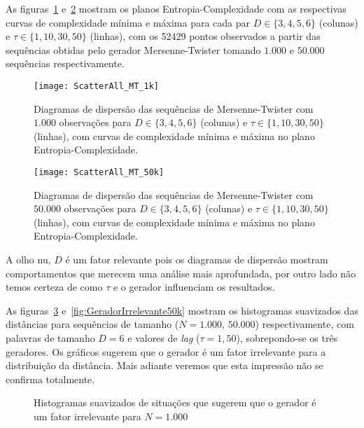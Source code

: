 As figuras~\ref{Fig:ScatterAll_MT_1k} e~\ref{Fig:ScatterAll_MT_50k} mostram os planos Entropia-Complexidade com as respectivas curvas de complexidade mínima e máxima para cada par $D\in\{3, 4, 5, 6\}$ (colunas) e $\tau\in\{1, 10, 30, 50\}$ (linhas), com os \num{52429} pontos observados a partir das sequências obtidas pelo gerador Mersenne-Twister tomando $1.000$ e $50.000$ sequências respectivamente.

\begin{figure}[hbt]
	\centering
	\texttt{[image: ScatterAll\_MT\_1k]}
	\caption{Diagramas de dispersão das sequências de Mersenne-Twister com $1.000$ observações para $D\in\{3, 4, 5, 6\}$ (colunas) e $\tau\in\{1, 10, 30, 50\}$ (linhas), com curvas de complexidade mínima e máxima no plano Entropia-Complexidade.}\label{Fig:ScatterAll_MT_1k}
\end{figure}

\begin{figure}[hbt]
	\centering
	\texttt{[image: ScatterAll\_MT\_50k]}
	\caption{Diagramas de dispersão das sequências de Mersenne-Twister com $50.000$ observações para $D\in\{3,4,5,6\}$ (colunas) e $\tau\in\{1,10,30,50\}$ (linhas), com curvas de complexidade mínima e máxima no plano Entropia-Complexidade.}\label{Fig:ScatterAll_MT_50k}
\end{figure}

A olho nu, $D$ é um fator relevante pois os diagramas de dispersão mostram comportamentos que merecem uma análise mais aprofundada, por outro lado não temos certeza de como $\tau$ e o gerador influenciam os resultados. 

As figuras~\ref{fig:GeradorIrrelevante1k} e~\ref{fig:GeradorIrrelevante50k} mostram os histogramas suavizados das distâncias para sequências de tamanho ($N=1.000$, $50.000$) respectivamente, com palavras de tamanho $D=6$  e valores de \textit{lag} ($\tau=1, 50$), sobrepondo-se os três geradores.
Os gráficos sugerem que o gerador é um fator irrelevante para a distribuição da distância.
Mais adiante veremos que esta impressão não se confirma totalmente.

\begin{figure} %
	\centering
		\caption{Histogramas suavizados de situações que sugerem que o gerador é um fator irrelevante para $N=1.000$}\label{fig:GeradorIrrelevante1k}
\end{figure}

